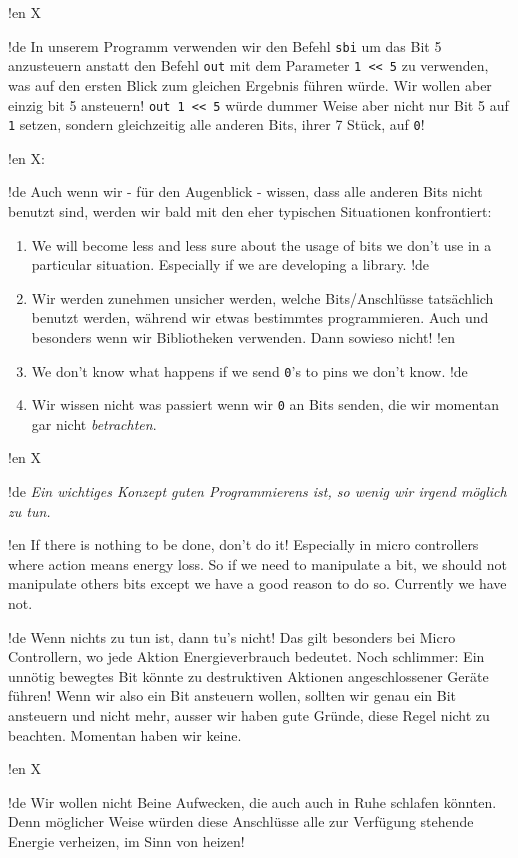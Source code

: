 !en X

!de In unserem Programm verwenden wir den Befehl \texttt{sbi} um das Bit 5 anzusteuern anstatt den Befehl \texttt{out} mit dem Parameter \texttt{1 << 5} zu verwenden, was auf den ersten Blick zum gleichen Ergebnis führen würde. Wir wollen aber einzig bit 5 ansteuern! \texttt{out 1 << 5} würde dummer Weise aber nicht nur Bit 5 auf \texttt{1} setzen, sondern gleichzeitig alle anderen Bits, ihrer 7 Stück, auf \texttt{0}!


!en X:

!de Auch wenn wir - für den Augenblick - wissen, dass alle anderen Bits nicht benutzt sind, werden wir bald mit den eher typischen Situationen konfrontiert:

\begin{enumerate}
!en   \item We will become less and less sure about the usage of bits we don't use in a particular situation. Especially if we are developing a library.
!de   \item Wir werden zunehmen unsicher werden, welche Bits/Anschlüsse tatsächlich benutzt werden, während wir etwas bestimmtes programmieren. Auch und besonders wenn wir Bibliotheken verwenden. Dann sowieso nicht!
!en   \item We don't know what happens if we send \texttt{0}'s to pins we don't know.
!de   \item Wir wissen nicht was passiert wenn wir \texttt{0} an Bits senden, die wir momentan gar nicht \textit{betrachten}.
\end{enumerate}



!en X

!de \emph{Ein wichtiges Konzept guten Programmierens ist, so wenig wir irgend möglich zu tun.}



!en If there is nothing to be done, don't do it! Especially in micro controllers where action means energy loss. So if we need to manipulate a bit, we should not manipulate others bits except we have a good reason to do so. Currently we have not.

!de Wenn nichts zu tun ist, dann tu's nicht! Das gilt besonders bei Micro Controllern, wo jede Aktion Energieverbrauch bedeutet. Noch schlimmer: Ein unnötig bewegtes Bit könnte zu destruktiven Aktionen angeschlossener Geräte führen! Wenn wir also ein Bit ansteuern wollen, sollten wir genau ein Bit ansteuern und nicht mehr, ausser wir haben gute Gründe, diese Regel nicht zu beachten. Momentan haben wir keine.



!en X

!de Wir wollen nicht Beine Aufwecken, die auch auch in Ruhe schlafen könnten. Denn möglicher Weise würden diese Anschlüsse alle zur Verfügung stehende Energie verheizen, im Sinn von heizen!
